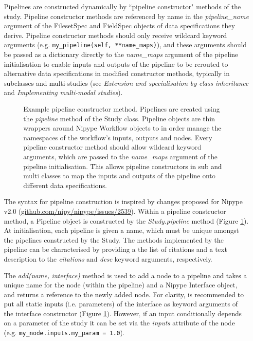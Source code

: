 \documentclass[smallextended]{svjour3}       %
\begin{document}
Pipelines are constructed dynamically by ``pipeline constructor" methods
of the study. Pipeline constructor methods are referenced by name in the \emph{pipeline\_name}
argument of the FilesetSpec and FieldSpec objects of data specifications
they derive. Pipeline constructor methods should only receive wildcard keyword
arguments (e.g. \lstinline{my_pipeline(self, **name_maps)}), and these arguments
should be passed as a dictionary directly to the \emph{name\_maps} argument
of the pipeline initialisation to enable inputs and outputs of the
pipeline to be rerouted to alternative data specifications in modified constructor
methods, typically in subclasses and multi-studies (see
\emph{Extension and specialisation by class inheritance} and \emph{Implementing multi-modal studies}).

\begin{figure}

\caption{Example pipeline constructor method. Pipelines are
created using the \emph{pipeline} method of the Study class.
Pipeline objects are thin wrappers around Nipype Workflow objects to
in order manage the namespaces of the workflow's inputs, outputs and nodes. Every
pipeline constructor method should allow wildcard keyword arguments,
which are passed to the \emph{name\_maps} argument of the pipeline
initialisation. This allows pipeline constructors in sub and multi classes to map the
inputs and outputs of the pipeline onto different data specifications.}
\label{fig:pipeline_constructor}
\end{figure}

The syntax for pipeline construction is inspired by changes proposed for Nipype v2.0
(\url{github.com/nipy/nipype/issues/2539}).
Within a pipeline constructor method, a Pipeline object is constructed by the \emph{Study.pipeline} method
(Figure \ref{fig:pipeline_constructor}). At initialisation, each pipeline is given a name,
which must be unique amongst the pipelines constructed by the Study. The methods implemented
by the pipeline can be characterised by providing a the list of citations
and a text description to the \emph{citations} and \emph{desc} keyword arguments, respectively.

The \emph{add(name, interface)} method is used to add a node to a pipeline and takes
a unique name for the node (within the pipeline) and a Nipype Interface object, and returns
a reference to the newly added node. For clarity, is recommended to put all static inputs
(i.e. parameters) of the interface as keyword arguments of the interface constructor
(Figure \ref{fig:pipeline_constructor}). However, if an input conditionally depends on a parameter of the
study it can be set via the \emph{inputs} attribute of the node (e.g. \lstinline{my_node.inputs.my_param = 1.0}).
\end{document}
